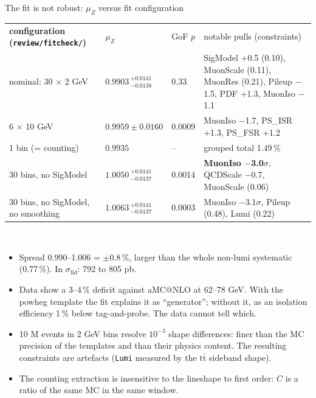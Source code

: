 \documentclass[aspectratio=169,9pt,t]{beamer}
\newcommand{\thead}{\rowcolor{primary}\color{bg}\bfseries}
\newcommand{\bestcell}[1]{\cellcolor{best}\textbf{#1}}
\newcommand{\tsize}{\scriptsize}
\newcommand{\muZ}{\mu_{Z}}
\newcommand{\sfid}{\sigma_{\mathrm{fid}}}
\begin{document}
\begin{frame}{The fit is not robust: $\muZ$ versus fit configuration}
  \tsize
  \begin{tabular}{L{4.4cm}R{2.2cm}R{1.2cm}L{5.2cm}}
    \thead configuration (\texttt{review/fitcheck/}) & $\muZ$ & GoF $p$ & notable pulls (constraints)\\
     nominal: 30 $\times$ 2 GeV & $0.9903\,^{+0.0141}_{-0.0138}$ & 0.33 & SigModel +0.5 (0.10), MuonScale (0.11), MuonRes (0.21), Pileup $-$1.5, PDF +1.3, MuonIso $-$1.1\\
     6 $\times$ 10 GeV & $0.9959 \pm 0.0160$ & 0.0009 & MuonIso $-$1.7, PS\_ISR +1.3, PS\_FSR +1.2\\
     1 bin (= counting) & \bestcell{$0.9935$} & -- & grouped total 1.49\,\%\\
     30 bins, no SigModel & $1.0050\,^{+0.0141}_{-0.0137}$ & 0.0014 & \textbf{MuonIso $-$3.0$\sigma$}, QCDScale $-$0.7, MuonScale (0.06)\\
     30 bins, no SigModel, no smoothing & $1.0063\,^{+0.0141}_{-0.0137}$ & 0.0003 & MuonIso $-$3.1$\sigma$, Pileup (0.48), Lumi (0.22)\\
  \end{tabular}\\[0.35cm]
  \begin{itemize}
    \item Spread 0.990--1.006 = $\pm$0.8\,\%, larger than the whole non-lumi systematic (0.77\,\%). In $\sfid$: 792 to 805 pb.
    \item Data show a 3--4\,\% deficit against aMC@NLO at 62--78 GeV. With the powheg template the fit explains it as ``generator''; without it, as an isolation efficiency 1\,\% below tag-and-probe. The data cannot tell which.
    \item 10 M events in 2 GeV bins resolve $10^{-3}$ shape differences: finer than the MC precision of the templates and than their physics content. The resulting constraints are artefacts (\texttt{Lumi} measured by the t$\bar{\mathrm{t}}$ sideband shape).
    \item The counting extraction is insensitive to the lineshape to first order: $C$ is a ratio of the same MC in the same window.
  \end{itemize}
\end{frame}
\end{document}
